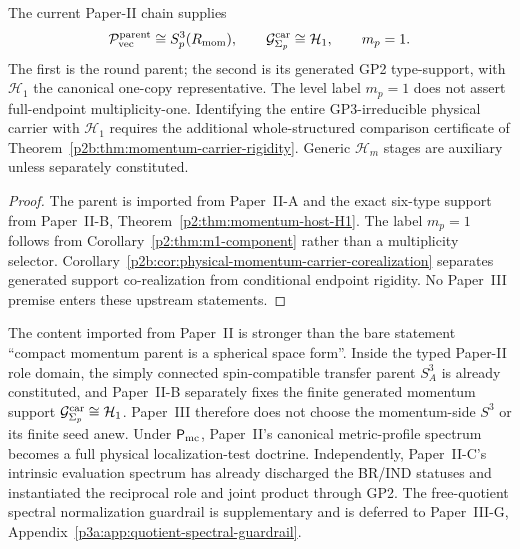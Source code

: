 \documentclass[12pt,a4paper]{article}
\begin{document}
\begin{theorem}
\label{p3:thm:momentum}
The current Paper-II chain supplies
\[
  \mathcal P_{\rm vec}^{\rm parent}\cong S^3_p(R_{\mathrm{mom}}),
  \qquad \mathcal G^{\rm car}_{\Sigma_p}\cong\mathcal H_1,
  \qquad m_p=1.
\]
The first is the round parent; the second is its generated GP2 type-support,
with $\mathcal H_1$ the canonical one-copy representative.  The level
label $m_p=1$ does not assert full-endpoint multiplicity-one.  Identifying
the entire GP3-irreducible physical carrier with $\mathcal H_1$ requires
the additional whole-structured comparison certificate of
Theorem~\ref{p2b:thm:momentum-carrier-rigidity}.
Generic $\mathcal H_m$ stages are auxiliary unless separately constituted.
\end{theorem}
\begin{proof}
The parent is imported from Paper~II-A and the exact six-type support from
Paper~II-B, Theorem~\ref{p2:thm:momentum-host-H1}.  The label $m_p=1$
follows from Corollary~\ref{p2:thm:m1-component} rather than a multiplicity
selector.  Corollary~\ref{p2b:cor:physical-momentum-carrier-corealization}
separates generated support co-realization from conditional endpoint rigidity.
No Paper~III premise enters these upstream statements.
\end{proof}
\begin{remark}
The content imported from Paper~II is stronger than the bare statement
``compact momentum parent is a spherical space form''.  Inside the typed
Paper-II role domain, the simply connected spin-compatible transfer parent
$S^3_A$ is already constituted, and Paper~II-B separately fixes the finite
generated momentum support $\mathcal G^{\rm car}_{\Sigma_p}\cong\mathcal H_1$.  Paper~III therefore does
not choose the momentum-side $S^3$ or its finite seed anew.  Under
$\mathsf P_{\rm mc}$, Paper~II's canonical metric-profile spectrum becomes a
full physical localization-test doctrine.  Independently, Paper~II-C's
intrinsic evaluation spectrum has already discharged the BR/IND statuses and
instantiated the reciprocal role and joint product through GP2.  The
free-quotient spectral
normalization guardrail is supplementary and is deferred to
Paper~III-G, Appendix~\ref{p3a:app:quotient-spectral-guardrail}.
\end{remark}
\end{document}
